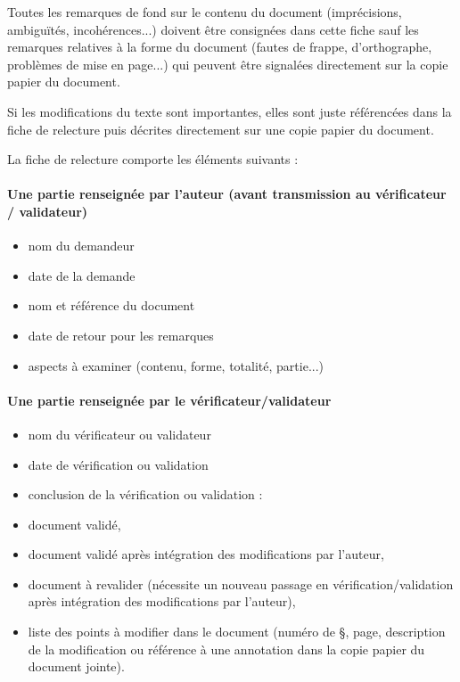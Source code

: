 \documentclass[a4paper]{article}
\begin{document}
Toutes les remarques de fond sur le contenu du document (imprécisions, ambiguïtés, incohérences...) doivent être consignées dans cette fiche sauf les remarques relatives à la forme du document (fautes de frappe, d'orthographe, problèmes de mise en page...) qui peuvent être signalées directement sur la copie papier du document.

Si les modifications du texte sont importantes, elles sont juste référencées dans la fiche de relecture puis décrites directement sur une copie papier du document.

La fiche de relecture comporte les éléments suivants : 

\paragraph{Une partie renseignée par l'auteur (avant transmission au vérificateur / validateur)}

\begin{itemize}
\item nom du demandeur
\item date de la demande
\item nom et référence du document
\item date de retour pour les remarques
\item aspects à examiner (contenu, forme, totalité, partie...)
\end{itemize}

\paragraph{Une partie renseignée par le vérificateur/validateur}

\begin{itemize}
\item nom du vérificateur ou validateur
\item date de vérification ou validation
\item conclusion de la vérification ou validation :
\item document validé,
\item document validé après intégration des modifications par l'auteur,
\item document à revalider (nécessite un nouveau passage en vérification/validation après intégration des modifications par l'auteur),
\item liste des points à modifier dans le document (numéro de §, page, description de la modification ou référence à une annotation dans la copie papier du document jointe).
\end{itemize}
\end{document}
